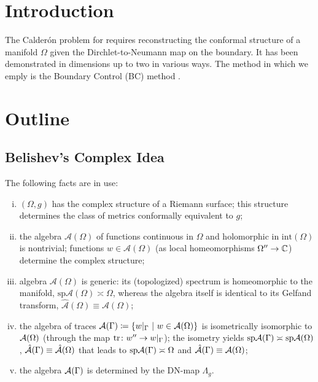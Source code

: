 \section{Introduction}
The Calder\'on problem for requires reconstructing the conformal structure of a manifold $\Omega$ given the Dirchlet-to-Neumann map on the boundary.  It has been demonstrated in dimensions up to two in various ways. The method in which we emply is the Boundary Control (BC) method \cite{belishev_complex}.  

\section{Outline}

\subsection{Belishev's Complex Idea}
The following facts are in use:
\begin{enumerate}[(i)]
	\item $(\Omega,g)$ has the complex structure of a Riemann surface; this structure determines
the class of metrics conformally equivalent to $g$;

	\item the algebra $\mathcal{A}(\Omega)$ of functions continuous in $\Omega$ and holomorphic in $\mathrm{int}(\Omega)$ is
nontrivial; functions $w\in \mathcal{A}(\Omega)$ (as local homeomorphisms $\Omega''\to \mathbb{C}$) determine the
complex structure;

	\item  algebra $\mathcal{A}(\Omega)$ is generic: its (topologized) spectrum is homeomorphic to the
manifold, $\mathrm{sp}\mathcal{A}(\Omega) \asymp \Omega$, whereas the algebra itself is identical to its Gelfand transform,
$\hat{\mathcal{A}}(\Omega) \equiv \mathcal{A}(\Omega)$;

	\item  the algebra of traces $\mathcal{A}(\Gamma) \coloneqq \{w\vert_{\Gamma} ~\vert~ w \in \mathcal{A}(\Omega)\}$ is isometrically isomorphic
to $\mathcal{A}(\Omega)$ (through the map $\mathrm{tr} \colon w'' \to w\vert_\Gamma$); the isometry yields $\mathrm{sp} \mathcal{A}(\Gamma) \asymp \mathrm{sp} \mathcal{A}(\Omega)$,
$\hat{\mathcal{A}}(\Gamma) \equiv \hat{\mathcal{A}}(\Omega)$ that leads to $\mathrm{sp} \mathcal{A}(\Gamma) \asymp \Omega$ and $\hat{\mathcal{A}}(\Gamma) \equiv \mathcal{A}(\Omega)$;

	\item the algebra $\mathcal{A}(\Gamma)$ is determined by the DN-map $\Lambda_g$.
\end{enumerate}



